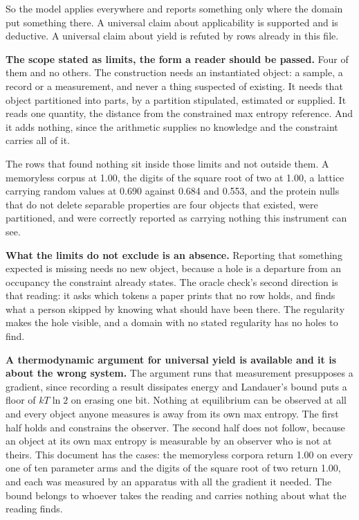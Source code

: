 So the model applies everywhere and reports something only where the domain put something there. A universal claim about applicability is supported and is deductive. A universal claim about yield is refuted by rows already in this file.

\textbf{The scope stated as limits, the form a reader should be passed.} Four of them and no others. The construction needs an instantiated object: a sample, a record or a measurement, and never a thing suspected of existing. It needs that object partitioned into parts, by a partition stipulated, estimated or supplied. It reads one quantity, the distance from the constrained max entropy reference. And it adds nothing, since the arithmetic supplies no knowledge and the constraint carries all of it.

The rows that found nothing sit inside those limits and not outside them. A memoryless corpus at 1.00, the digits of the square root of two at 1.00, a lattice carrying random values at 0.690 against 0.684 and 0.553, and the protein nulls that do not delete separable properties are four objects that existed, were partitioned, and were correctly reported as carrying nothing this instrument can see.

\textbf{What the limits do not exclude is an absence.} Reporting that something expected is missing needs no new object, because a hole is a departure from an occupancy the constraint already states. The oracle check's second direction is that reading: it asks which tokens a paper prints that no row holds, and finds what a person skipped by knowing what should have been there. The regularity makes the hole visible, and a domain with no stated regularity has no holes to find.

\textbf{A thermodynamic argument for universal yield is available and it is about the wrong system.} The argument runs that measurement presupposes a gradient, since recording a result dissipates energy and Landauer's bound puts a floor of \(kT\ln 2\) on erasing one bit. Nothing at equilibrium can be observed at all and every object anyone measures is away from its own max entropy. The first half holds and constrains the observer. The second half does not follow, because an object at its own max entropy is measurable by an observer who is not at theirs. This document has the cases: the memoryless corpora return 1.00 on every one of ten parameter arms and the digits of the square root of two return 1.00, and each was measured by an apparatus with all the gradient it needed. The bound belongs to whoever takes the reading and carries nothing about what the reading finds.

